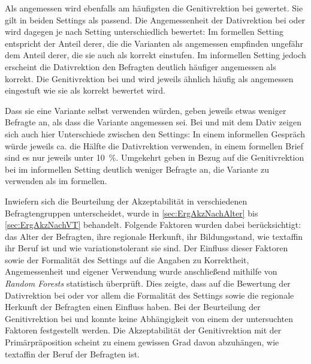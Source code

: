 Als angemessen wird ebenfalls am häufigsten die Genitivrektion bei \dank{} gewertet. 
Sie gilt in beiden Settings als passend. 
Die Angemessenheit der Dativrektion bei \wegen{} oder \waehrend{} wird dagegen je nach Setting unterschiedlich bewertet:
Im formellen Setting entspricht der Anteil derer, die die Varianten als angemessen empfinden ungefähr dem Anteil derer, die sie auch als korrekt einstufen. 
Im informellen Setting jedoch erscheint die Dativrektion den Befragten deutlich häufiger angemessen als korrekt. 
Die Genitivrektion bei \gegenueber{} und  wird jeweils ähnlich häufig als angemessen eingestuft wie sie als korrekt bewertet wird. 

Dass sie eine Variante selbst verwenden würden, geben jeweils etwas weniger Befragte an, als dass die Variante angemessen sei.
Bei \wegen{} und \waehrend{} mit dem Dativ zeigen sich auch hier Unterschiede zwischen den Settings:
In einem informellen Gespräch würde jeweils ca. die Hälfte die Dativrektion verwenden, in einem formellen Brief sind es nur jeweils unter 10~\%. 
Umgekehrt geben in Bezug auf die Genitivrektion bei  im informellen Setting deutlich weniger Befragte an, die Variante zu verwenden als im formellen. 

Inwiefern sich die Beurteilung der Akzeptabilität in verschiedenen Befragtengruppen unterscheidet, wurde in \autoref{sec:ErgAkzNachAlter} bis \autoref{sec:ErgAkzNachVT} behandelt. 
Folgende Faktoren wurden dabei berücksichtigt:
das Alter der Befragten, ihre regionale Herkunft, ihr Bildungsstand, wie textaffin ihr Beruf ist und wie variationstolerant sie sind. 
Der Einfluss dieser Faktoren sowie der Formalität des Settings auf die Angaben zu Korrektheit, Angemessenheit und eigener Verwendung wurde anschließend mithilfe von \textit{Random Forests} statistisch überprüft. 
Dies zeigte, dass auf die Bewertung der Dativrektion bei \wegen{} oder \waehrend{} vor allem die Formalität des Settings sowie die regionale Herkunft der Befragten einen Einfluss haben. 
Bei der Beurteilung der Genitivrektion bei \dank{} und \gegenueber{} konnte keine Abhängigkeit von einem der untersuchten Faktoren festgestellt werden. 
Die Akzeptabilität der Genitivrektion mit der Primärpräposition  scheint zu einem gewissen Grad davon abzuhängen, wie textaffin der Beruf der Befragten ist. 

